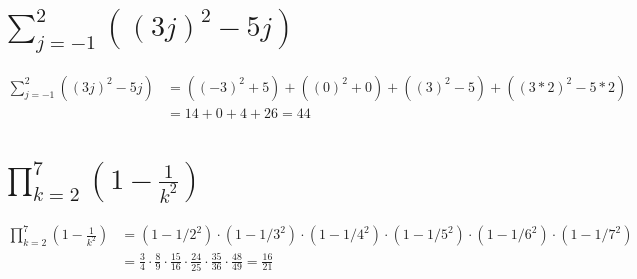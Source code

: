 \begin{parts}
    \part{
        $\sum_{j=-1}^2{\left((3j)^2-5j\right)}$
    }
    \begin{solution}
        \begin{align*}
            \sum_{j=-1}^2{\left((3j)^2-5j\right)} &=
            \left((-3)^2+5\right) +
            \left((0)^2+0\right) +
            \left((3)^2-5\right) +
            \left((3*2)^2-5*2\right)\\
            & = 14+0+4+26 = 44
        \end{align*}
    \end{solution}

    \part{
        $\prod_{k=2}^7{\left(1-\frac{1}{k^2}\right)}$
    }
    \begin{solution}
        \begin{align*}
            \prod_{k=2}^7{\left(1-\frac{1}{k^2}\right)} &=
            \left(1-1/2^2\right)\cdot
            \left(1-1/3^2\right)\cdot
            \left(1-1/4^2\right)\cdot
            \left(1-1/5^2\right)\cdot
            \left(1-1/6^2\right)\cdot
            \left(1-1/7^2\right)\\
            & = \frac{3}{4} \cdot
            \frac{8}{9} \cdot
            \frac{15}{16} \cdot
            \frac{24}{25} \cdot
            \frac{35}{36} \cdot
            \frac{48}{49}=\frac{16}{21}
        \end{align*}
    \end{solution}
\end{parts}